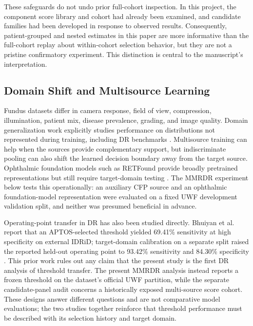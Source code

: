 \documentclass{ieeeaccess}
\begin{document}
These safeguards do not undo prior full-cohort inspection. In this project, the component score library and cohort had already been examined, and candidate families had been developed in response to observed results. Consequently, patient-grouped and nested estimates in this paper are more informative than the full-cohort replay about within-cohort selection behavior, but they are not a pristine confirmatory experiment. This distinction is central to the manuscript's interpretation.

\subsection{Domain Shift and Multisource Learning}
Fundus datasets differ in camera response, field of view, compression, illumination, patient mix, disease prevalence, grading, and image quality. Domain generalization work explicitly studies performance on distributions not represented during training, including DR benchmarks \cite{galappaththige2024}. Multisource training can help when the sources provide complementary support, but indiscriminate pooling can also shift the learned decision boundary away from the target source. Ophthalmic foundation models such as RETFound provide broadly pretrained representations but still require target-domain testing \cite{retfound}. The MMRDR experiment below tests this operationally: an auxiliary CFP source and an ophthalmic foundation-model representation were evaluated on a fixed UWF development validation split, and neither was presumed beneficial in advance.

Operating-point transfer in DR has also been studied directly. Bhuiyan et al. report that an APTOS-selected threshold yielded 69.41\% sensitivity at high specificity on external IDRiD; target-domain calibration on a separate split raised the reported held-out operating point to 93.42\% sensitivity and 84.30\% specificity \cite{bhuiyan2026}. This prior work rules out any claim that the present study is the first DR analysis of threshold transfer. The present MMRDR analysis instead reports a frozen threshold on the dataset's official UWF partition, while the separate candidate-panel audit concerns a historically exposed multi-source score cohort. These designs answer different questions and are not comparative model evaluations; the two studies together reinforce that threshold performance must be described with its selection history and target domain.
\end{document}
